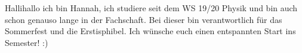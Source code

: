 \begin{multicols}{2}
{

Hallihallo ich bin Hannah, ich studiere seit dem WS 19/20 Physik und bin auch schon genauso lange in der Fachschaft. 
Bei dieser bin verantwortlich für das Sommerfest und die Erstisphibel. Ich wünsche euch einen entspannten Start ins Semester! :)
}


\end{multicols}
